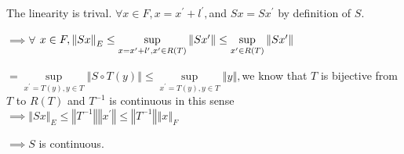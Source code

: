\documentclass{article}
\begin{document}
The linearity is trival. $\forall x\in F,x=x^{\prime }+l^{\prime },$and $%
Sx=Sx^{\prime }$ by definition of $S.$

$\implies \forall $ $x\in F,\left\Vert Sx\right\Vert _{E}\leq \underset{%
x=x^{\prime }+l^{\prime },x^{\prime }\in R\left( T\right) }{\sup }\left\Vert
Sx^{\prime }\right\Vert \leq \underset{x^{\prime }\in R\left( T\right) }{%
\sup }\left\Vert Sx^{\prime }\right\Vert $

$=\allowbreak \underset{x^{\prime }=T\left( y\right) ,y\in T}{\sup }%
\left\Vert S\circ T\left( y\right) \right\Vert \leq \underset{x^{\prime
}=T\left( y\right) ,y\in T}{\sup }\left\Vert y\right\Vert ,$we know that $T$
is bijective from $T$ to $R\left( T\right) $ and $T^{-1}$ is continuous in
this sense $\implies \left\Vert Sx\right\Vert _{E}\leq \left\Vert
T^{-1}\right\Vert \left\Vert x^{\prime }\right\Vert \leq \left\Vert
T^{-1}\right\Vert \left\Vert x\right\Vert _{F}$

$\implies S$ is continuous. 
\end{document}
